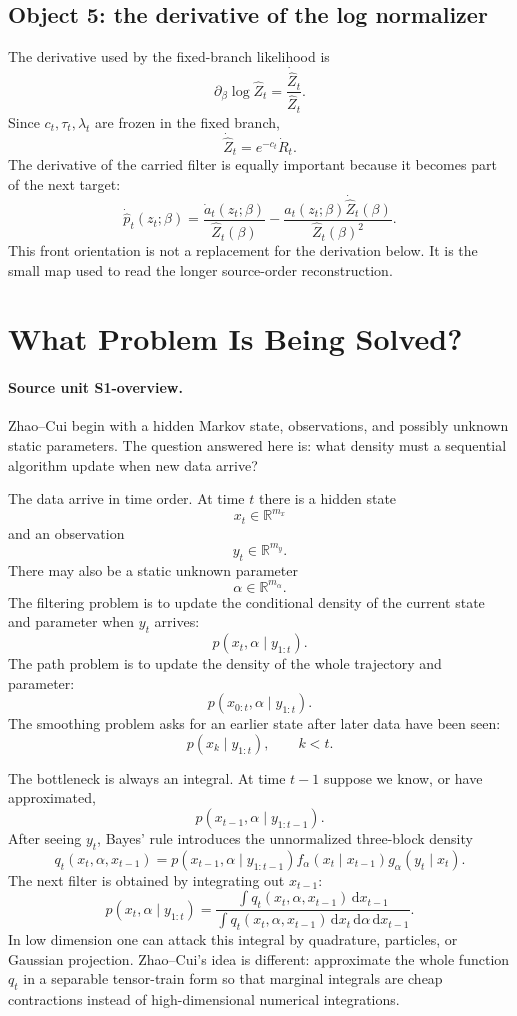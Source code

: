 \documentclass[11pt]{article}
\newcommand{\R}{\mathbb R}
\newcommand{\dd}{\,\mathrm d}
\begin{document}
\subsection*{Object 5: the derivative of the log normalizer}

The derivative used by the fixed-branch likelihood is
\[
    \partial_\beta\log\widehat Z_t
    =
    \frac{\dot{\widehat Z}_t}{\widehat Z_t}.
    \tag{P22-O16}
\]
Since \(c_t,\tau_t,\lambda_t\) are frozen in the fixed branch,
\[
    \dot{\widehat Z}_t=e^{-c_t}\dot R_t.
    \tag{P22-O17}
\]
The derivative of the carried filter is equally important because it becomes
part of the next target:
\[
    \dot{\widehat p}_t(z_t;\beta)
    =
    \frac{\dot a_t(z_t;\beta)}{\widehat Z_t(\beta)}
    -
    \frac{a_t(z_t;\beta)\dot{\widehat Z}_t(\beta)}
    {\widehat Z_t(\beta)^2}.
    \tag{P22-O18}
\]
This front orientation is not a replacement for the derivation below.  It is
the small map used to read the longer source-order reconstruction.

\section{What Problem Is Being Solved?}

\paragraph{Source unit S1-overview.}
Zhao--Cui begin with a hidden Markov state, observations, and possibly unknown
static parameters.  The question answered here is: what density must a
sequential algorithm update when new data arrive?

The data arrive in time order.  At time \(t\) there is a hidden state
\[
    x_t\in \R^{m_x}
\]
and an observation
\[
    y_t\in \R^{m_y}.
\]
There may also be a static unknown parameter
\[
    \alpha\in \R^{m_\alpha}.
\]
The filtering problem is to update the conditional density of the current state
and parameter when \(y_t\) arrives:
\[
    p(x_t,\alpha\mid y_{1:t}).
\]
The path problem is to update the density of the whole trajectory and parameter:
\[
    p(x_{0:t},\alpha\mid y_{1:t}).
\]
The smoothing problem asks for an earlier state after later data have been seen:
\[
    p(x_k\mid y_{1:t}),\qquad k<t.
\]

The bottleneck is always an integral.  At time \(t-1\) suppose we know, or have
approximated,
\[
    p(x_{t-1},\alpha\mid y_{1:t-1}).
\]
After seeing \(y_t\), Bayes' rule introduces the unnormalized three-block
density
\[
    q_t(x_t,\alpha,x_{t-1})
    =
    p(x_{t-1},\alpha\mid y_{1:t-1})
    f_\alpha(x_t\mid x_{t-1})
    g_\alpha(y_t\mid x_t).
\]
The next filter is obtained by integrating out \(x_{t-1}\):
\[
    p(x_t,\alpha\mid y_{1:t})
    =
    \frac{\int q_t(x_t,\alpha,x_{t-1})\dd x_{t-1}}
    {\int q_t(x_t,\alpha,x_{t-1})\dd x_t\dd\alpha\dd x_{t-1}}.
\]
In low dimension one can attack this integral by quadrature, particles, or
Gaussian projection.  Zhao--Cui's idea is different: approximate the whole
function \(q_t\) in a separable tensor-train form so that marginal integrals are
cheap contractions instead of high-dimensional numerical integrations.
\end{document}
